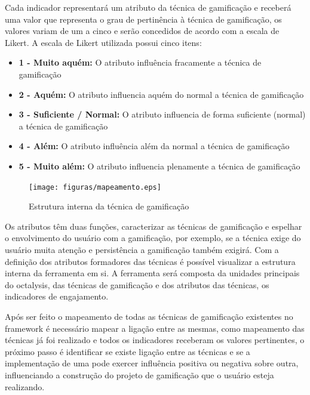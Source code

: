 Cada indicador representará um atributo da técnica de gamificação e receberá uma valor que representa o grau de pertinência à técnica de gamificação, os valores variam de um a cinco e serão concedidos de acordo com a escala de Likert. A escala de Likert  \cite{arruda200} utilizada possui cinco itens: 

\begin{itemize}
\item  \textbf {1 - Muito aquém:} O atributo influência fracamente a técnica de gamificação
\item  \textbf {2 - Aquém:} O atributo influencia aquém do normal a técnica de gamificação
\item  \textbf {3 - Suficiente / Normal:} O atributo influencia de forma suficiente (normal) a técnica de gamificação
\item  \textbf {4 - Além:} O atributo influência além da normal a técnica de gamificação
\item  \textbf {5 - Muito além:} O atributo influencia plenamente a técnica de gamificação
\end{itemize}


\begin{figure}[h]
	\centering
	\label{fig01}
		\texttt{[image: figuras/mapeamento.eps]}
	\caption{Estrutura interna da técnica de gamificação}
\end{figure}

Os atributos têm duas funções, caracterizar as técnicas de gamificação e espelhar o envolvimento do usuário com a gamificação, por exemplo, se a técnica exige do usuário muita atenção e persistência a gamificação também exigirá. Com a definição dos atributos formadores das técnicas é possível visualizar a estrutura interna da ferramenta em si. A ferramenta será composta da unidades principais do octalysis, das técnicas de gamificação e dos atributos das técnicas, os indicadores de engajamento. 

Após ser feito o mapeamento de todas as técnicas de gamificação existentes no framework é necessário mapear a ligação entre as mesmas, como mapeamento das técnicas já foi realizado e todos os indicadores receberam os valores pertinentes, o próximo passo é identificar se existe ligação entre as técnicas e se a implementação de uma pode exercer influência positiva ou negativa sobre outra, influenciando a construção do projeto de gamificação que o usuário esteja realizando.




